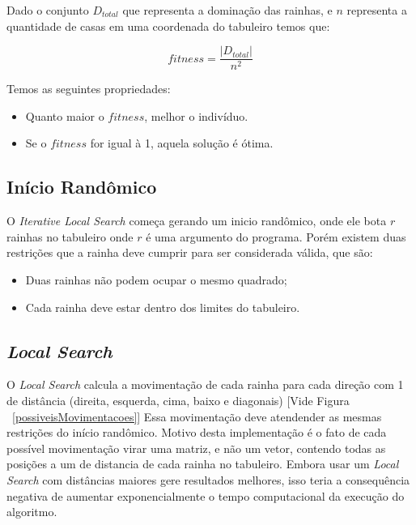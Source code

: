 \documentclass[
	article,			%
	11pt,				%
	oneside,			%
	a4paper,			%
	english,			%
	brazil,				%
	sumario=tradicional
	]{abntex2}
\begin{document}
Dado o conjunto $D{_{total}}$ que representa a dominação das rainhas, e $n$ representa a quantidade de casas em uma coordenada do tabuleiro temos que:

\begin{equation}
 fitness = \frac{\left | D{_{total}} \right |}{n^{2}}
\end{equation}

Temos as seguintes propriedades:
\begin{itemize}

  \item Quanto maior o $fitness$, melhor o indivíduo.
  
  \item Se o $fitness$ for igual à 1, aquela solução é ótima.
  
\end{itemize}

\subsection{Início Randômico}

O \textit{Iterative Local Search} começa gerando um inicio randômico, onde ele bota $r$ rainhas no tabuleiro onde $r$ é uma argumento do programa. Porém existem duas restrições que a rainha deve cumprir para ser considerada válida, que são: 
\begin{itemize}

  \item Duas rainhas não podem ocupar o mesmo quadrado;
 
  \item Cada rainha deve estar dentro dos limites do tabuleiro.

\end{itemize}

\subsection{\textit{Local Search}}
O \textit{Local Search} calcula a movimentação de cada rainha para cada direção com 1 de distância (direita, esquerda, cima, baixo e diagonais) [Vide Figura ~\ref{possiveisMovimentacoes}] Essa movimentação deve atendender as mesmas restrições do início randômico. Motivo desta implementação é o fato de cada possível movimentação virar uma matriz, e não um vetor, contendo todas as posições a um de distancia de cada rainha no tabuleiro. Embora usar um \textit{Local Search} com distâncias maiores gere resultados melhores, isso teria a consequência negativa de aumentar exponencialmente o tempo computacional da execução do algoritmo.
\end{document}
